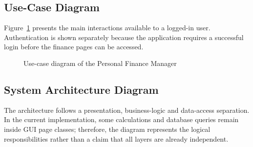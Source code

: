\documentclass{tietreport}
\begin{document}
\subsection{Use-Case Diagram}

Figure~\ref{fig:usecase} presents the main interactions available to a
logged-in user. Authentication is shown separately because the application
requires a successful login before the finance pages can be accessed.

\begin{figure}[htbp]
\centering
\begin{center}
\end{center}
\caption{Use-case diagram of the Personal Finance Manager}
\label{fig:usecase}
\end{figure}

\subsection{System Architecture Diagram}

The architecture follows a presentation, business-logic and data-access
separation. In the current implementation, some calculations and database
queries remain inside GUI page classes; therefore, the diagram represents the
logical responsibilities rather than a claim that all layers are already
independent.
\end{document}
